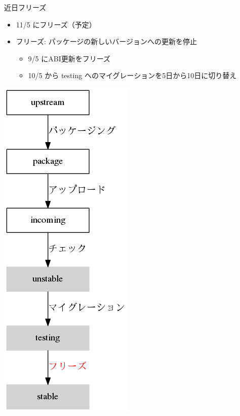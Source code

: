 
\begin{frame}{近日フリーズ}
 
\begin{minipage}{0.55\hsize}
\begin{itemize}
\item 11/5 にフリーズ（予定）
\item フリーズ: パッケージの新しいバージョンへの更新を停止
\begin{itemize}
\item 9/5 にABI更新をフリーズ
\item 10/5 から testing へのマイグレーションを5日から10日に切り替え
\end{itemize}
\end{itemize}
\end{minipage}
\begin{minipage}{0.39\hsize}
\begin{center}
\includegraphics[scale=0.3]{image201410/lifesycle-package.png}
\end{center}
\end{minipage}
\end{frame}


